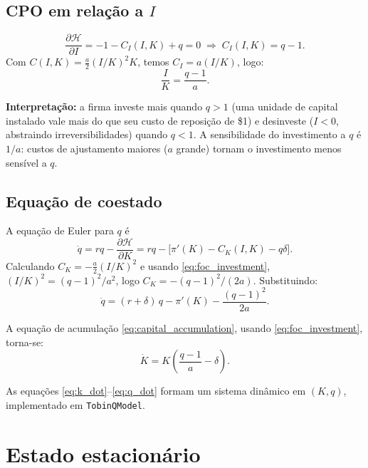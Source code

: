 \documentclass[11pt,a4paper]{article}
\begin{document}
\subsection{CPO em relação a $I$}

\[
  \frac{\partial \mathcal{H}}{\partial I} = -1 - C_I(I,K) + q = 0
  \;\Longrightarrow\; C_I(I,K) = q - 1.
\]
Com $C(I,K)=\tfrac{a}{2}(I/K)^2 K$, temos $C_I = a(I/K)$, logo:
\begin{equation}\label{eq:foc_investment}
  \boxed{\frac{I}{K} = \frac{q-1}{a}.}
\end{equation}

\textbf{Interpretação:} a firma investe mais quando $q>1$ (uma unidade
de capital instalado vale mais do que seu custo de reposição de \$1) e
desinveste ($I<0$, abstraindo irreversibilidades) quando $q<1$. A
sensibilidade do investimento a $q$ é $1/a$: custos de ajustamento
maiores ($a$ grande) tornam o investimento menos sensível a $q$.

\subsection{Equação de coestado}

A equação de Euler para $q$ é
\[
  \dot q = rq - \frac{\partial \mathcal{H}}{\partial K}
         = rq - \bigl[\pi'(K) - C_K(I,K) - q\delta\bigr].
\]
Calculando $C_K = -\tfrac{a}{2}(I/K)^2$ e usando \eqref{eq:foc_investment},
$(I/K)^2 = (q-1)^2/a^2$, logo $C_K = -(q-1)^2/(2a)$. Substituindo:
\begin{equation}\label{eq:q_dot}
  \boxed{\dot q = (r+\delta)\,q - \pi'(K) - \frac{(q-1)^2}{2a}.}
\end{equation}

A equação de acumulação \eqref{eq:capital_accumulation}, usando
\eqref{eq:foc_investment}, torna-se:
\begin{equation}\label{eq:k_dot}
  \boxed{\dot K = K\left(\frac{q-1}{a} - \delta\right).}
\end{equation}

As equações \eqref{eq:k_dot}--\eqref{eq:q_dot} formam um sistema
dinâmico em $(K,q)$, implementado em \texttt{TobinQModel}.

\section{Estado estacionário}
\end{document}
